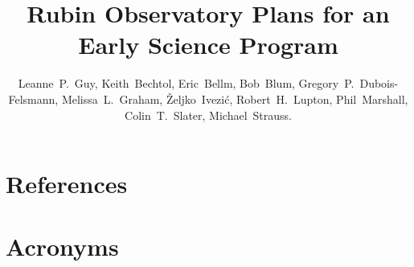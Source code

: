 \documentclass[DM,authoryear,lsstdraft,toc]{lsstdoc}
\title{Rubin Observatory Plans for an Early Science Program}
\author{%
Leanne~P.~Guy, Keith~Bechtol, Eric~Bellm, Bob~Blum, Gregory~P.~Dubois-Felsmann, Melissa~L.~Graham,
\v{Z}eljko~Ivezi\'{c}, Robert~H.~Lupton, Phil~Marshall, Colin~T.~Slater, Michael~Strauss.}
\date{\vcsDate}
\begin{document}
\maketitle

%










\appendix
\section{References} \label{sec:bib}
\renewcommand{\refname}{} %


\section{Acronyms} \label{sec:acronyms}

\end{document}
